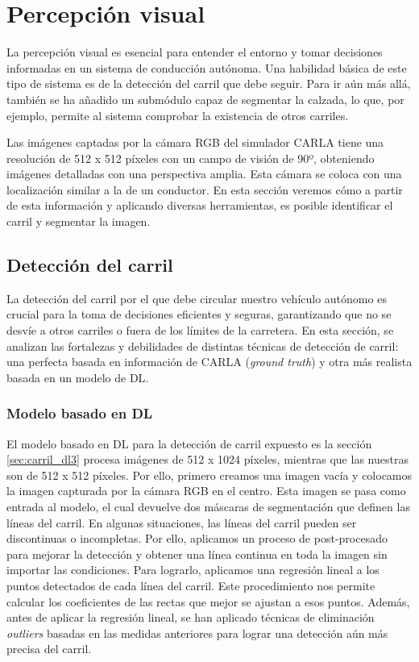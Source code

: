 \section{Percepción visual}

La percepción visual es esencial para entender el entorno y tomar decisiones informadas en un sistema de conducción autónoma. Una habilidad básica de este tipo de sistema es de la detección del carril que debe seguir. Para ir aún más allá, también se ha añadido un submódulo capaz de segmentar la calzada, lo que, por ejemplo, permite al sistema comprobar la existencia de otros carriles.

Las imágenes captadas por la cámara RGB del simulador CARLA tiene una resolución de 512 x 512 píxeles con un campo de visión de 90º, obteniendo imágenes detalladas con una perspectiva amplia. Esta cámara se coloca con una localización similar a la de un conductor. En esta sección veremos cómo a partir de esta información y aplicando diversas herramientas, es posible identificar el carril y segmentar la imagen.

\subsection{Detección del carril}

La detección del carril por el que debe circular nuestro vehículo autónomo es crucial para la toma de decisiones eficientes y seguras, garantizando que no se desvíe a otros carriles o fuera de los límites de la carretera. En esta sección, se analizan las fortalezas y debilidades de distintas técnicas de detección de carril: una perfecta basada en información de CARLA (\textit{ground truth}) y otra más realista basada en un modelo de \ac{DL}.

\subsubsection{Modelo basado en \ac{DL}}

El modelo basado en \ac{DL} para la detección de carril expuesto es la sección \ref{sec:carril_dl3} procesa imágenes de 512 x 1024 píxeles, mientras que las nuestras son de 512 x 512 píxeles. Por ello, primero creamos una imagen vacía y colocamos la imagen capturada por la cámara RGB en el centro. Esta imagen se pasa como entrada al modelo, el cual devuelve dos máscaras de segmentación que definen las líneas del carril. En algunas situaciones, las líneas del carril pueden ser discontinuas o incompletas. Por ello, aplicamos un proceso de post-procesado para mejorar la detección y obtener una línea continua en toda la imagen sin importar las condiciones. Para lograrlo, aplicamos una regresión lineal a los puntos detectados de cada línea del carril. Este procedimiento nos permite calcular los coeficientes de las rectas que mejor se ajustan a esos puntos. Además, antes de aplicar la regresión lineal, se han aplicado técnicas de eliminación \textit{outliers} basadas en las medidas anteriores para lograr una detección aún más precisa del carril. 

